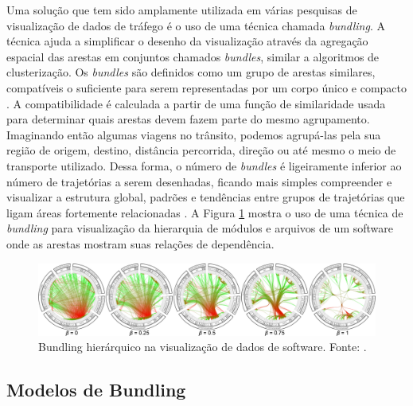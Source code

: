  Uma solução que tem sido amplamente utilizada em várias pesquisas de
visualização de dados de tráfego é o uso de uma técnica chamada
\emph{bundling}. A técnica ajuda a simplificar o desenho da visualização
através da agregação espacial das arestas em conjuntos chamados
\emph{bundles}, similar a algoritmos de clusterização. Os \emph{bundles} são
definidos como um grupo de arestas similares, compatíveis o suficiente para
serem representadas por um corpo único e compacto \citep{Lhuillier2017}. A
compatibilidade é calculada a partir de uma função de similaridade usada para
determinar quais arestas devem fazem parte do mesmo agrupamento.
Imaginando então algumas viagens no trânsito, podemos agrupá-las pela sua
região de origem, destino, distância percorrida, direção ou até mesmo o meio de
transporte utilizado.  Dessa forma, o número de \emph{bundles} é ligeiramente
inferior ao número de trajetórias a serem desenhadas, ficando mais simples
compreender e visualizar a estrutura global, padrões e tendências entre grupos
de trajetórias que ligam áreas fortemente relacionadas \citep{Zhou2013}.  A
Figura \ref{fig:bundling-hierarquico} mostra o uso de uma técnica de
\emph{bundling} para visualização da hierarquia de módulos e arquivos de um
software onde as arestas mostram suas relações de dependência.

\begin{figure}[!htb]
  \centering
  \includegraphics[width=1\textwidth]{../figuras/hierarquical-edge-bundling.png}
  \caption[Bundling hierárquico na visualização de dados de software]{Bundling hierárquico na visualização de dados de software. Fonte: \citep{Holten2006}.}
  \label{fig:bundling-hierarquico}
\end{figure}

\subsection{Modelos de Bundling}

